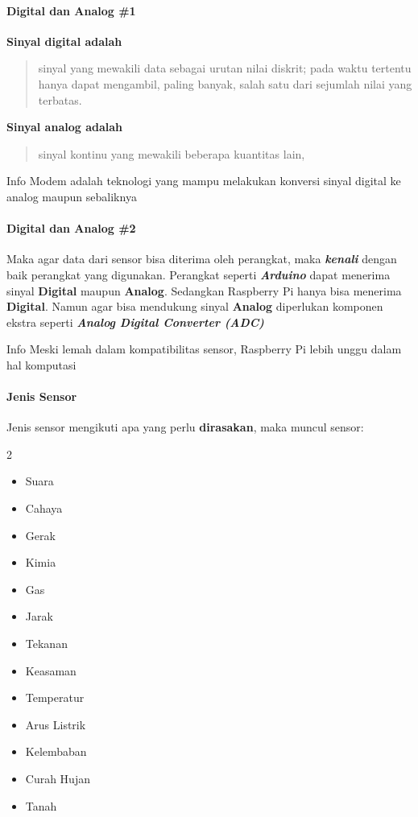 \begin{frame}{\insertsectionhead}
	\framesubtitle{Digital dan Analog \#1}
	\justifying
	\textbf{Sinyal digital adalah }
	\vfill
	\begin{quote}
	sinyal yang mewakili data sebagai urutan nilai diskrit; pada waktu tertentu hanya dapat mengambil, paling banyak, salah satu dari sejumlah nilai yang terbatas.
	\end{quote}
	\vfill
	\textbf{Sinyal analog adalah }
	\vfill
	\begin{quote}
	sinyal kontinu yang mewakili beberapa kuantitas lain,
	\end{quote}
	\begin{block}{Info}
		Modem adalah teknologi yang mampu melakukan konversi sinyal digital ke analog maupun sebaliknya
	\end{block}
\end{frame}

\begin{frame}{\insertsectionhead}
	\framesubtitle{Digital dan Analog \#2}
	\justifying
	Maka agar data dari sensor bisa diterima oleh perangkat, maka \textbf{\textit{kenali}} dengan baik perangkat yang digunakan. Perangkat seperti \textbf{\textit{Arduino}} dapat menerima sinyal \textbf{Digital} maupun \textbf{Analog}. Sedangkan Raspberry Pi hanya bisa menerima \textbf{Digital}. Namun agar bisa mendukung sinyal \textbf{Analog} diperlukan komponen ekstra seperti \textbf{\textit{Analog Digital Converter (ADC)}}
	\vfill
	\begin{block}{Info}
		Meski lemah dalam kompatibilitas sensor, Raspberry Pi lebih unggu dalam hal komputasi
	\end{block}
\end{frame}

\begin{frame}{\insertsectionhead}
	\framesubtitle{Jenis Sensor}
	\justifying
	Jenis sensor mengikuti apa yang perlu \textbf{dirasakan}, maka muncul sensor:
	\begin{multicols}{2}
		\begin{itemize}
			\item Suara
			\item Cahaya
			\item Gerak
			\item Kimia
			\item Gas
			\item Jarak
			\item Tekanan
			\item Keasaman
			\item Temperatur
			\item Arus Listrik
			\item Kelembaban
			\item Curah Hujan
			\item Tanah
		\end{itemize}
	\end{multicols}
\end{frame}

